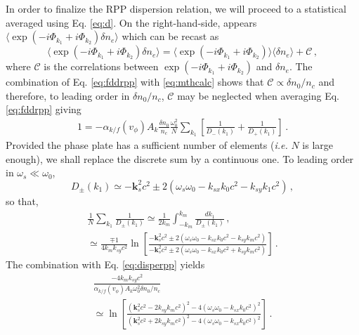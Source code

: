 \documentclass[
 reprint,
 amsmath,amssymb,
 aps,
]{revtex4-1}
\begin{document}
In order to finalize the RPP dispersion relation, we will proceed to a statistical averaged using Eq. \eqref{eq:d}. On the right-hand-side, appears $\langle\exp(-i\Phi_{k_1}+i\Phi_{k_2})\delta n_e \rangle$ which can be recast as
\begin{equation}
\langle\exp(-i\Phi_{k_1}+i\Phi_{k_2})\delta n_e \rangle= \langle\exp(-i\Phi_{k_1}+i\Phi_{k_2}) \rangle\langle\delta n_e \rangle + \mathcal{C}\, , \label{eq:mthcalc}
\end{equation}
where $\mathcal{C}$ is the correlations   between  \mbox{$\exp(-i\Phi_{k_1}+i\Phi_{k_2})$} and $\delta n_e$. The combination of Eq. \eqref{eq:fddrpp} with \eqref{eq:mthcalc} shows that $\mathcal{C}\propto \delta n_0/n_c$ and therefore, to leading order in $\delta n_0/n_c$, $\mathcal{C}$ may  be neglected when  averaging   Eq. \eqref{eq:fddrpp} giving
\begin{align}
  1= -\alpha_{k/f}(v_\phi)A_k \frac{\delta n_0}{n_c} \frac{\omega_0^2}{N}\sum_{ k_{1} }        \left[ \frac{1 }{D_-(k_{1})} +\frac{1}{D_+(k_{1})} \right] \, .\label{eq:disperpp} 
\end{align}
Provided the phase plate has a sufficient number of elements (\emph{i.e.} $N$ is large enough), we shall replace the discrete sum by a continuous one. To leading order 
in  $\omega_s\ll\omega_0$, 
\begin{equation}\label{eq:dpmk1}
D_\pm(k_1) \simeq -\mathbf{k}_s^2c^2\pm 2(\omega_s\omega_0 - k_{sx}k_0 c^2-k_{sy} k_1 c^2) \, , 
\end{equation} 
so that,
\begin{align}
 \frac{1}{N} \sum_{ k_{1} }  \frac{1 }{D_\pm(k_{1})}  \simeq \frac{1}{2k_m} \int_{ -k_m }^{ k_m }       \frac{dk_1 }{D_\pm(k_{1})}  \, , \nonumber\\
 \simeq \frac{\mp1}{4k_mk_{sy}c^2} \ln\left[
 \frac{ -\mathbf{k}_s^2c^2\pm 2(\omega_s\omega_0 - k_{sx}k_0 c^2-k_{sy} k_m c^2)}{ -\mathbf{k}_s^2c^2\pm 2(\omega_s\omega_0 - k_{sx}k_0 c^2+k_{sy} k_m c^2)} \right] \, .\label{eq:sumint} 
\end{align}
The combination with Eq. \eqref{eq:disperpp} yields
\begin{align}
 \frac{-4k_mk_{sy}c^2}{\alpha_{k/f}(v_\phi)A_k \omega_0^2\delta n_0/n_c  } \nonumber\\
 \simeq  \ln\left[
 \frac{ (\mathbf{k}_s^2c^2-2k_{sy} k_m c^2)^2 -4(\omega_s\omega_0 - k_{sx}k_0 c^2)^2}{ (\mathbf{k}_s^2c^2+2k_{sy} k_m c^2)^2 -4(\omega_s\omega_0 - k_{sx}k_0 c^2)^2} \right] \, .\label{eq:disperpp2} 
\end{align}
\end{document}
